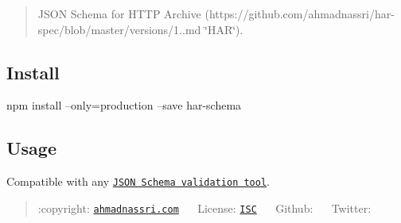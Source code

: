 \begin{quote}
J\+S\+ON Schema for H\+T\+TP Archive (https\+://github.com/ahmadnassri/har-\/spec/blob/master/versions/1..\+md \char`\"{}\+H\+A\+R\char`\"{}). \end{quote}


\href{https://travis-ci.org/ahmadnassri/har-schema}{\tt } \href{https://www.npmjs.com/package/har-schema}{\tt } \href{https://codeclimate.com/github/ahmadnassri/har-schema}{\tt } \href{https://codeclimate.com/github/ahmadnassri/har-schema}{\tt } \href{https://dependencyci.com/github/ahmadnassri/har-schema}{\tt } \href{https://david-dm.org/ahmadnassri/har-schema}{\tt }

\subsection*{Install}


\begin{DoxyCode}
npm install --only=production --save har-schema
\end{DoxyCode}


\subsection*{Usage}

Compatible with any \href{https://github.com/ahmadnassri/har-validator}{\tt J\+S\+ON Schema validation tool}. 

 \begin{quote}
\+:copyright\+: \href{https://www.ahmadnassri.com/}{\tt ahmadnassri.\+com} ~\textperiodcentered{}~ License\+: \href{http://choosealicense.com/licenses/isc/}{\tt I\+SC} ~\textperiodcentered{}~ Github\+: \href{https://github.com/ahmadnassri}{\tt } ~\textperiodcentered{}~ Twitter\+: \href{https://twitter.com/ahmadnassri}{\tt } \end{quote}
